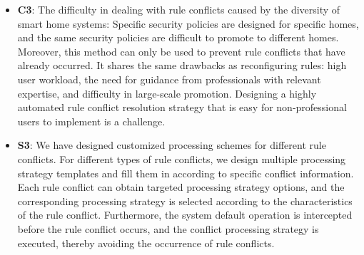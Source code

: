 \begin{itemize}
	\item \textbf{C3}: The difficulty in dealing with rule conflicts caused by the diversity of smart home systems: Specific security policies are designed for specific homes, and the same security policies are difficult to promote to different homes. Moreover, this method can only be used to prevent rule conflicts that have already occurred. It shares the same drawbacks as reconfiguring rules: high user workload, the need for guidance from professionals with relevant expertise, and difficulty in large-scale promotion. Designing a highly automated rule conflict resolution strategy that is easy for non-professional users to implement is a challenge.
	\item \textbf{S3}: We have designed customized processing schemes for different rule conflicts. For different types of rule conflicts, we design multiple processing strategy templates and fill them in according to specific conflict information. Each rule conflict can obtain targeted processing strategy options, and the corresponding processing strategy is selected according to the characteristics of the rule conflict. Furthermore, the system default operation is intercepted before the rule conflict occurs, and the conflict processing strategy is executed, thereby avoiding the occurrence of rule conflicts.
\end{itemize}